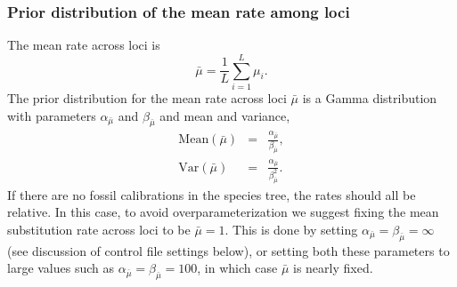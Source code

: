 \documentclass[a4paper]{book}
\numberwithin{equation}{section} \renewcommand{\baselinestretch}{0.55}
\begin{document}
\subsubsection{Prior distribution of the mean rate among loci}
The mean rate across loci is
\begin{displaymath}
  \bar{\mu} = \frac{1}{L} \sum_{i=1}^L \mu_i.
\end{displaymath}
The prior distribution for the mean rate across loci $\bar{\mu}$ is a
Gamma distribution with parameters $\alpha_{\bar{\mu}}$ and
$\beta_{\bar{\mu}}$ and mean and variance,
\begin{eqnarray}
  \textrm{Mean}(\bar{\mu}) & = & \frac{\alpha_{\bar{\mu}}}{\beta_{\bar{\mu}}}, \nonumber \\
  \textrm{Var}(\bar{\mu}) & = & \frac{\alpha_{\bar{\mu}}}{\beta_{\bar{\mu}}^2}. \nonumber
\end{eqnarray}
If there are no fossil calibrations in the species tree, the rates
should all be relative.  In this case, to avoid overparameterization
we suggest fixing the mean substitution rate across loci to be
$\bar\mu = 1$. This is done by setting
$\alpha_{\bar{\mu}} = \beta_{\bar{\mu}} = \infty$ (see discussion of
control file settings below), or setting both these parameters to
large values such as $\alpha_{\bar{\mu}} = \beta_{\bar{\mu}} = 100$,
in which case $\bar{\mu}$ is nearly fixed.
\end{document}
